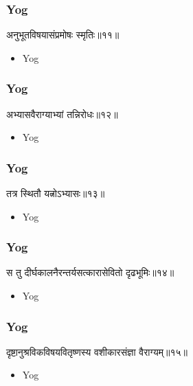 \begin{frame}[fragile]\frametitle{Yog}
\begin{sanskrit}
अनुभूतविषयासंप्रमोषः स्मृतिः॥११॥
\end{sanskrit}
	\begin{itemize}
	\item Yog 
	\end{itemize}
\end{frame}


\begin{frame}[fragile]\frametitle{Yog}
\begin{sanskrit}
अभ्यासवैराग्याभ्यां तन्निरोधः॥१२॥
\end{sanskrit}
	\begin{itemize}
	\item Yog 
	\end{itemize}
\end{frame}


\begin{frame}[fragile]\frametitle{Yog}
\begin{sanskrit}
तत्र स्थितौ यत्नोऽभ्यासः॥१३॥
\end{sanskrit}
	\begin{itemize}
	\item Yog 
	\end{itemize}
\end{frame}

\begin{frame}[fragile]\frametitle{Yog}
\begin{sanskrit}
स तु दीर्घकालनैरन्तर्यसत्कारासेवितो दृढभूमिः॥१४॥
\end{sanskrit}
	\begin{itemize}
	\item Yog 
	\end{itemize}
\end{frame}

\begin{frame}[fragile]\frametitle{Yog}
\begin{sanskrit}
दृष्टानुश्रविकविषयवितृष्णस्य वशीकारसंज्ञा वैराग्यम्॥१५॥
\end{sanskrit}
	\begin{itemize}
	\item Yog 
	\end{itemize}
\end{frame}


